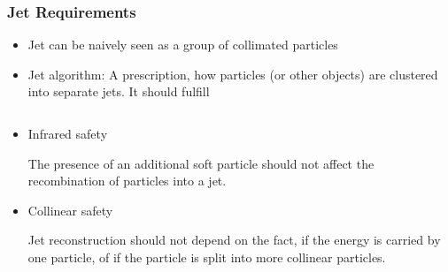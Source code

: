 \documentclass[compress]{beamer}
\begin{document}
\begin{frame}
\frametitle{Jet Requirements}
  \begin{itemize}
    \item Jet can be naively seen as a group of collimated particles
    \item Jet algorithm: A prescription, how particles (or other objects) are clustered
          into separate jets. It should fulfill
  \end{itemize}
\begin{columns}[onlytextwidth]
  \begin{column}{0.6\textwidth}
      \begin{itemize}
        \item Infrared safety  
          
          The presence of an additional soft particle
          should not affect the recombination of particles into a jet.
        \item Collinear safety  
          
          Jet reconstruction should not depend on the
          fact, if the energy is carried by one particle, of if the particle is
          split into more collinear particles.
      \end{itemize}
  \end{column}
  \begin{column}{0.4\textwidth}
    \begin{figure}[b]
      \centering
      \texttt{[image: \{../PrezentationATLASmeeting/clustering]}.png}
    \end{figure}
  \end{column}
\end{columns}
\end{frame}
\end{document}
